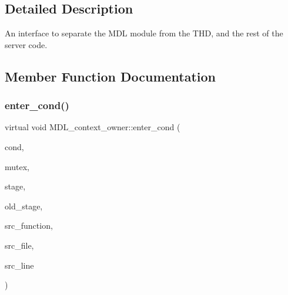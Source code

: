 \subsection{Detailed Description}
An interface to separate the M\+DL module from the T\+HD, and the rest of the server code. 

\subsection{Member Function Documentation}
\mbox{\label{classMDL__context__owner_abac4e3f3e71847b2e0db7d64c89ab0b0}} 
\subsubsection{\texorpdfstring{enter\+\_\+cond()}{enter\_cond()}}
{\footnotesize\ttfamily virtual void M\+D\+L\+\_\+context\+\_\+owner\+::enter\+\_\+cond (\begin{DoxyParamCaption}\item[{mysql\+\_\+cond\+\_\+t $\ast$}]{cond,  }\item[{mysql\+\_\+mutex\+\_\+t $\ast$}]{mutex,  }\item[{const P\+S\+I\+\_\+stage\+\_\+info $\ast$}]{stage,  }\item[{P\+S\+I\+\_\+stage\+\_\+info $\ast$}]{old\+\_\+stage,  }\item[{const char $\ast$}]{src\+\_\+function,  }\item[{const char $\ast$}]{src\+\_\+file,  }\item[{int}]{src\+\_\+line }\end{DoxyParamCaption})\hspace{0.3cm}{\ttfamily [pure virtual]}}

